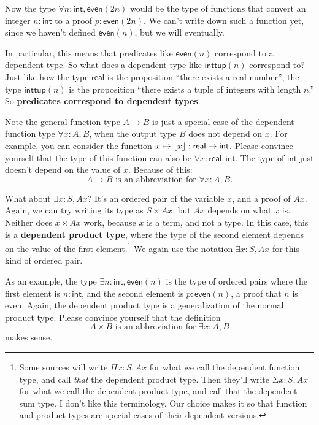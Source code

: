 \documentclass[11pt,paper=letter]{scrartcl}
\newcommand{\sf}{\mathsf}
\begin{document}
Now the type $\forall n: \sf{int}, \sf{even}(2n)$ would be the type of functions that convert an integer $n : \sf{int}$ to a proof $p : \sf{even}(2n)$. We can't write down such a function yet, since we haven't defined $\sf{even}(n)$, but we will eventually.

In particular, this means that predicates like $\sf{even}(n)$ correspond to a dependent type. So what does a dependent type like $\sf{inttup}(n)$ correspond to? Just like how the type $\sf{real}$ is the proposition ``there exists a real number'', the type $\sf{inttup}(n)$ is the proposition ``there exists a tuple of integers with length $n$.'' So \textbf{predicates correspond to dependent types}.

Note the general function type $A \to B$ is just a special case of the dependent function type $\forall x: A, B$, when the output type $B$ does not depend on $x$. For example, you can consider the function $x \mapsto \floor{x} : \sf{real} \to \sf{int}$. Please convince yourself that the type of this function can also be $\forall x: \sf{real}, \sf{int}$. The type of $\sf{int}$ just doesn't depend on the value of $x$. Because of this: \[
  A \to B \text{ is an abbreviation for } \forall x: A, B.
\]

What about $\exists x: S, Ax$? It's an ordered pair of the variable $x$, and a proof of $Ax$. Again, we can try writing its type as $S \times Ax$, but $Ax$ depends on what $x$ is. Neither does $x \times Ax$ work, because $x$ is a term, and not a type. In this case, this is a \textbf{dependent product type}, where the type of the second element depends on the value of the first element.\footnote{Some sources will write $\Pi x: S, Ax$ for what we call the dependent function type, and call \emph{that} the dependent product type. Then they'll write $\Sigma x: S, Ax$ for what we call the dependent product type, and call that the dependent sum type. I don't like this terminology. Our choice makes it so that function and product types are special cases of their dependent versions.} We again use the notation $\exists x : S, Ax$ for this kind of ordered pair.

As an example, the type $\exists n: \sf{int}, \sf{even}(n)$ is the type of ordered pairs where the first element is $n : \sf{int}$, and the second element is $p : \sf{even}(n)$, a proof that $n$ is even. Again, the dependent product type is a generalization of the normal product type. Please convince yourself that the definition \[
  A \times B \text{ is an abbreviation for } \exists x: A, B
\]
makes sense.
\end{document}
